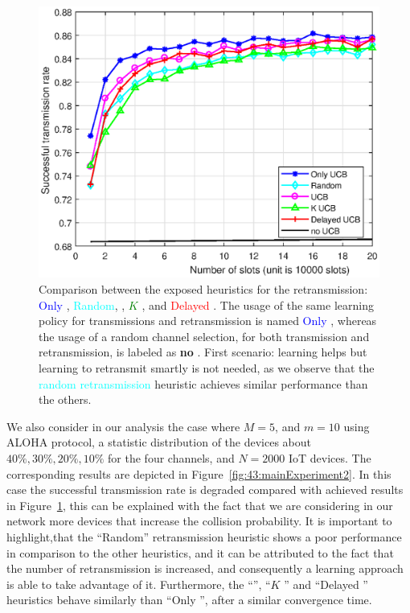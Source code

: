 \begin{figure}[h!]  %
	\centering
	\includegraphics[width=0.75\linewidth]{ResultsUCB.eps}
	\caption[First comparison between the exposed heuristics for the retransmission: Only \UCB, Random, \UCB, $K$ \UCB, and Delayed \UCB]{
		Comparison between the exposed heuristics for the retransmission: \textcolor{blue}{Only \UCB}, \textcolor{cyan}{Random}, \textcolor{purple}{\UCB}, \textcolor{green}{$K$ \UCB}, and \textcolor{red}{Delayed \UCB}.
		The usage of the same learning policy for transmissions and retransmission is named \textcolor{blue}{Only \UCB{}},
		whereas the usage of a random channel selection, for both transmission and retransmission, is labeled as \textbf{no \UCB{}}.
		First scenario: learning helps but learning to retransmit smartly is not needed, as we observe that the \textcolor{cyan}{random retransmission} heuristic achieves similar performance than the others.
	}
	\label{fig:43:mainExperiment1}
\end{figure}

We also consider in our analysis the case where $M=5$, and $m=10$ using ALOHA protocol, a statistic distribution of the devices about $40\%, 30\%, 20\%, 10\%$ for the four channels, and $N=2000$ IoT devices.
The corresponding results are depicted in Figure~\ref{fig:43:mainExperiment2}.
In this case the successful transmission rate is degraded compared with achieved results in Figure~\ref{fig:43:mainExperiment1}, this can be explained with the fact that we are considering in our network more devices that increase the collision probability.
It is important to highlight,that the ``Random'' retransmission heuristic shows a poor performance in comparison to the other heuristics, and it can be attributed to the fact that the number of retransmission is increased, and consequently a
learning approach is able to take advantage of it.
Furthermore, the ``\UCB'', ``$K$ \UCB'' and ``Delayed \UCB'' heuristics behave similarly than ``Only \UCB'', after a similar convergence time.

